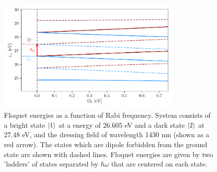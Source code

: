 \begin{figure}
	\centering
	\includegraphics[width=0.8\textwidth]{figures/ATS/floquet_energies.pdf}
	\caption[Floquet energies as a function of Rabi frequency.]{Floquet energies as a function of Rabi frequency.  System consists of a bright state $\ket{1}$ at a energy of 26.605 eV and a dark state $\ket{2}$ at 27.48 eV, and the dressing field of wavelength 1430 nm (shown as a red arrow).  The states which are dipole forbidden from the ground state are shown with dashed lines.  Floquet energies are given by two 'ladders' of states separated by $\hbar\omega$ that are centered on each state.}
	\label{fig:floquet_energies}
\end{figure}


